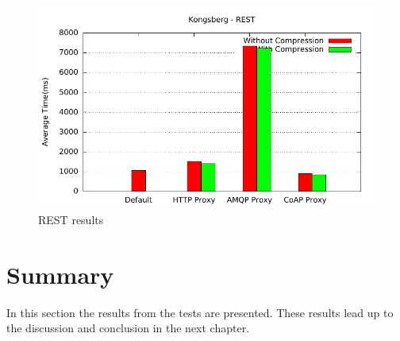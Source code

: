 \begin{figure}[H]
\center
\includegraphics[scale=0.75]{../results/kongsberg/rest/out.pdf}
\caption{REST results}
\end{figure}




\section{Summary}

In this section the results from the tests are presented. These results lead up
to the discussion and conclusion in the next chapter.
